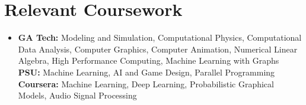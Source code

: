 \documentclass[letterpaper,11pt]{article}
\newcommand{\resumeItem}[1]{
  \item\small{
    {#1 \vspace{-2pt}}
  }
}
\newcommand{\resumeSubHeadingListStart}{\begin{itemize}[leftmargin=0.15in, label={}]}
\newcommand{\resumeSubHeadingListEnd}{\end{itemize}}
\begin{document}
\section{Relevant Coursework}
  \resumeSubHeadingListStart
    \resumeItem{
      \textbf{GA Tech:}{ Modeling and Simulation, Computational Physics, Computational Data Analysis, Computer Graphics, Computer Animation, Numerical Linear Algebra, High Performance Computing, Machine Learning with Graphs} \\ \vspace{3pt}
      \textbf{PSU:}{ Machine Learning, AI and Game Design, Parallel Programming} \\ \vspace{3pt}
      \textbf{Coursera:}{ Machine Learning, Deep Learning, Probabilistic Graphical Models, Audio Signal Processing} \\ \vspace{3pt}
    }
    \resumeSubHeadingListEnd
\end{document}
